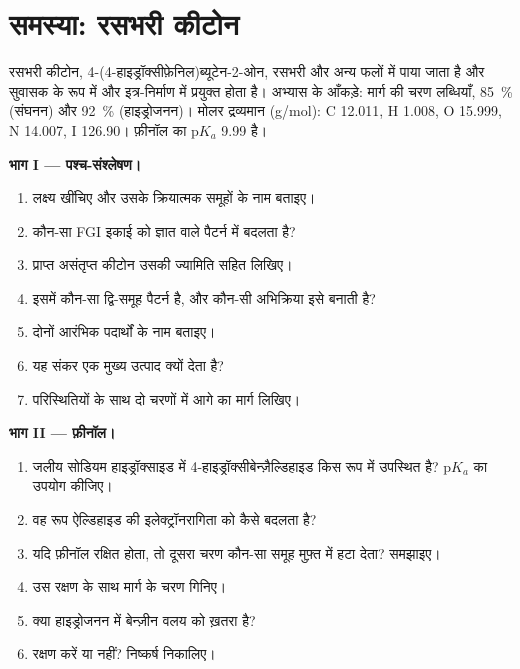 \section{समस्या: रसभरी कीटोन}

\begin{problem}
\label{pb:b2:retrosynthesis:1}
रसभरी कीटोन, 4-(4-हाइड्रॉक्सीफ़ेनिल)ब्यूटेन-2-ओन, रसभरी और अन्य फलों में पाया जाता है और
सुवासक के रूप में और इत्र-निर्माण में प्रयुक्त होता है। अभ्यास के आँकड़े:  मार्ग की चरण लब्धियाँ, 85~\% (संघनन)
और 92~\% (हाइड्रोजनन)। मोलर द्रव्यमान (\unit{g/mol}): C 12.011, H 1.008, O 15.999, N 14.007,
I 126.90। फ़ीनॉल का $\mathrm pK_a$ 9.99 है।

\medskip
\noindent\textbf{भाग I --- पश्च-संश्लेषण।}
\begin{enumerate}
  \item लक्ष्य खींचिए और उसके क्रियात्मक समूहों के नाम बताइए।
  \item कौन-सा FGI  इकाई को ज्ञात  वाले पैटर्न में बदलता है?
  \item प्राप्त असंतृप्त कीटोन उसकी ज्यामिति सहित लिखिए।
  \item इसमें कौन-सा द्वि-समूह पैटर्न है, और कौन-सी अभिक्रिया इसे बनाती है?
  \item दोनों आरंभिक पदार्थों के नाम बताइए।
  \item यह संकर  एक मुख्य उत्पाद क्यों देता है?
  \item परिस्थितियों के साथ दो चरणों में आगे का मार्ग लिखिए।
\end{enumerate}

\medskip
\noindent\textbf{भाग II --- फ़ीनॉल।}
\begin{enumerate}[resume]
  \item जलीय सोडियम हाइड्रॉक्साइड में 4-हाइड्रॉक्सीबेन्ज़ैल्डिहाइड किस रूप में उपस्थित है?
        $\mathrm pK_a$ का उपयोग कीजिए।
  \item वह रूप ऐल्डिहाइड की इलेक्ट्रॉनरागिता को कैसे बदलता है?
  \item यदि फ़ीनॉल रक्षित होता, तो दूसरा चरण कौन-सा समूह मुफ़्त में हटा देता? समझाइए।
  \item उस रक्षण के साथ मार्ग के चरण गिनिए।
  \item क्या हाइड्रोजनन में बेन्ज़ीन वलय को ख़तरा है?
  \item रक्षण करें या नहीं? निष्कर्ष निकालिए।
\end{enumerate}


\end{problem}
